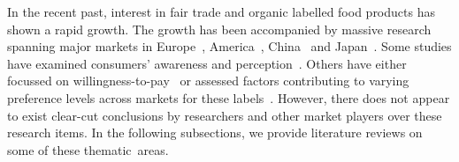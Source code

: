 \documentclass[sustainability,article,accept,moreauthors,pdftex,10pt,a4paper]{Definitions/mdpi}
\theoremstyle{mdpi}
\newcounter{ex}
\newcounter{re}
\theoremstyle{mdpidefinition}
\begin{document}
\par{In the recent past, interest in fair trade and organic labelled food products has shown a rapid growth. The growth has been accompanied by massive research  spanning major markets in \mbox{Europe~\cite{Rousseau2015, Gallenti2016}}, America~\cite{Loureiro2005,VanLoo2015}, China~\cite{Yang2012,Wang2018} and Japan~\cite{keiko2017}. Some studies have examined consumers' awareness and perception~\cite{Rousseau2015, Tebbe2017Does}. Others have either focussed on willingness-to-pay~\cite{Didier2008,VanLoo2015} or assessed factors contributing to varying preference levels across markets for these labels~\cite{Bray2011,Annunziata2011,Moser2011}. However, there does not appear to exist clear-cut conclusions by researchers and other market players over these research items. In the following subsections, we provide literature reviews on some of these thematic~areas.}
\end{document}

